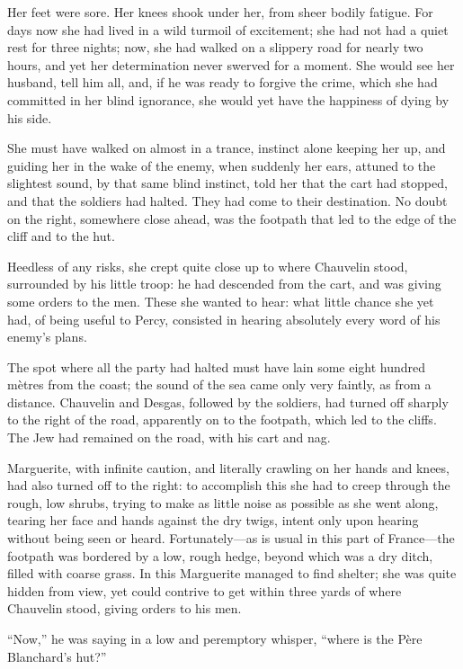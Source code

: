 \documentclass[paper=5.5in:8.5in,BCOR=7mm,twoside,DIV=calc,12pt,usegeometry,chapterprefix,endperiod,headings=big]{scrbook}
\begin{document}
Her feet were sore. Her knees shook under her, from sheer bodily fatigue. For days now she had lived in a wild turmoil of excitement; she had not had a quiet rest for three nights; now, she had walked on a slippery road for nearly two hours, and yet her determination never swerved for a moment. She would see her husband, tell him all, and, if he was ready to forgive the crime, which she had committed in her blind ignorance, she would yet have the happiness of dying by his side.

She must have walked on almost in a trance, instinct alone keeping her up, and guiding her in the wake of the enemy, when suddenly her ears, attuned to the slightest sound, by that same blind instinct, told her that the cart had stopped, and that the soldiers had halted. They had come to their destination. No doubt on the right, somewhere close ahead, was the footpath that led to the edge of the cliff and to the hut.

Heedless of any risks, she crept quite close up to where Chauvelin stood, surrounded by his little troop: he had descended from the cart, and was giving some orders to the men. These she wanted to hear: what little chance she yet had, of being useful to Percy, consisted in hearing absolutely every word of his enemy's plans.

The spot where all the party had halted must have lain some eight hundred mètres from the coast; the sound of the sea came only very faintly, as from a distance. Chauvelin and Desgas, followed by the soldiers, had turned off sharply to the right of the road, apparently on to the footpath, which led to the cliffs. The Jew had remained on the road, with his cart and nag.

Marguerite, with infinite caution, and literally crawling on her hands and knees, had also turned off to the right: to accomplish this she had to creep through the rough, low shrubs, trying to make as little noise as possible as she went along, tearing her face and hands against the dry twigs, intent only upon hearing without being seen or heard. Fortunately---as is usual in this part of France---the footpath was bordered by a low, rough hedge, beyond which was a dry ditch, filled with coarse grass. In this Marguerite managed to find shelter; she was quite hidden from view, yet could contrive to get within three yards of where Chauvelin stood, giving orders to his men.

\enquote{Now,} he was saying in a low and peremptory whisper, \enquote{where is the Père Blanchard's hut?}
\end{document}
